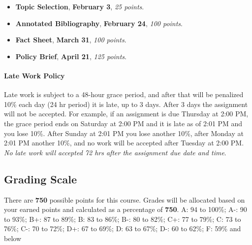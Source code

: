 \begin{itemize}
\item
  \faInbox \hspace{0.005in} \textbf{Topic Selection},
  \faCalendar \hspace{0.005in} \textbf{February 3}, \emph{25 points}.
\item
  \faInbox \hspace{0.005in} \textbf{Annotated Bibliography},
  \faCalendar \hspace{0.005in} \textbf{February 24}, \emph{100 points}.
\item
  \faInbox \hspace{0.005in} \textbf{Fact Sheet},
  \faCalendar \hspace{0.005in} \textbf{March 31}, \emph{100 points}.
\item
  \faInbox \hspace{0.005in} \textbf{Policy Brief},
  \faCalendar \hspace{0.005in} \textbf{April 21}, \emph{125 points}.
\end{itemize}

\hypertarget{late-work-policy}{%
\paragraph{Late Work Policy}\label{late-work-policy}}

Late work is subject to a 48-hour grace period, and after that will be
penalized 10\% each day (24 hr period) it is late, up to 3 days. After 3
days the assignment will not be accepted. For example, if an assignment
is due Thursday at 2:00 PM, the grace period ends on Saturday at 2:00 PM
and it is late as of 2:01 PM and you lose 10\%. After Sunday at 2:01 PM
you lose another 10\%, after Monday at 2:01 PM another 10\%, and no work
will be accepted after Tuesday at 2:00 PM. \emph{No late work will
accepted 72 hrs after the assignment due date and time}.

\hypertarget{grading-scale}{%
\subsection{Grading Scale}\label{grading-scale}}

There are \textbf{750} possible points for this course. Grades will be
allocated based on your earned points and calculated as a percentage of
\textbf{750}. A: 94 to 100\%; A-: 90 to 93\%; B+: 87 to 89\%; B: 83 to
86\%; B-: 80 to 82\%; C+: 77 to 79\%; C: 73 to 76\%; C-: 70 to 72\%; D+:
67 to 69\%; D: 63 to 67\%; D-: 60 to 62\%; F: 59\% and below
